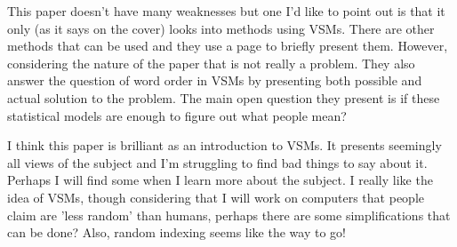\documentclass[10pt]{article}
\begin{document}
\begin{review}
    This paper doesn't have many weaknesses but one I'd like to point out is that it only (as it says on the cover) looks into methods using VSMs.
    There are other methods that can be used and they use a page to briefly present them.
    However, considering the nature of the paper that is not really a problem.
    They also answer the question of word order in VSMs by presenting both possible and actual solution to the problem.
    The main open question they present is if these statistical models are enough to figure out what people mean?
    
    I think this paper is brilliant as an introduction to VSMs.
    It presents seemingly all views of the subject and I'm struggling to find bad things to say about it.
    Perhaps I will find some when I learn more about the subject.
    I really like the idea of VSMs, though considering that I will work on computers that people claim are 'less random' than humans, perhaps there are some simplifications that can be done?
    Also, random indexing seems like the way to go!
\end{review}
\end{document}
